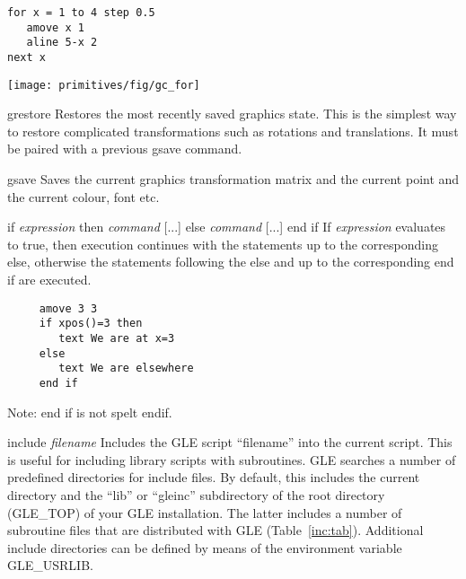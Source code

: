 \begin{commanddescription}
\begin{minipage}[c]{8cm}
\begin{Verbatim}
for x = 1 to 4 step 0.5
   amove x 1
   aline 5-x 2
next x
\end{Verbatim}
\end{minipage}
\hfill
\begin{minipage}[c]{7cm}
\mbox{\texttt{[image: primitives/fig/gc\_for]}}
\end{minipage}

\item[{\sf grestore}]
 Restores the most recently saved graphics state.  This is the simplest way to
restore complicated transformations such as rotations and translations.  It
must be paired with a previous {\sf gsave} command.

\item[{\sf gsave}]
 Saves the current graphics transformation matrix and the current point
and the current colour, font etc.

\item[{\sf if {\it expression} then {\it command} [...] else {\it command} [...] end if}]
If {\it expression} evaluates to true, then execution continues with the
statements up to the corresponding {\sf else}, otherwise the statements
following the {\sf else} and up to the corresponding {\sf end if} are executed.

\preglecode{}
\begin{Verbatim}
     amove 3 3
     if xpos()=3 then
        text We are at x=3
     else
        text We are elsewhere
     end if
\end{Verbatim}
\postglecode{}

Note: {\sf end if} is not spelt {\sf endif}.

\item[{\sf include {\it filename}}]\label{incl:cmnd}
 Includes the GLE script ``filename'' into the current script. This is useful for including library scripts with subroutines. GLE searches a number of predefined directories for include files. By default, this includes the current directory and the ``lib'' or ``gleinc'' subdirectory of the root directory (GLE\_TOP) of your GLE installation. The latter includes a number of subroutine files that are distributed with GLE (Table~\ref{inc:tab}). Additional include directories can be defined by means of the environment variable GLE\_USRLIB.


\end{commanddescription}

